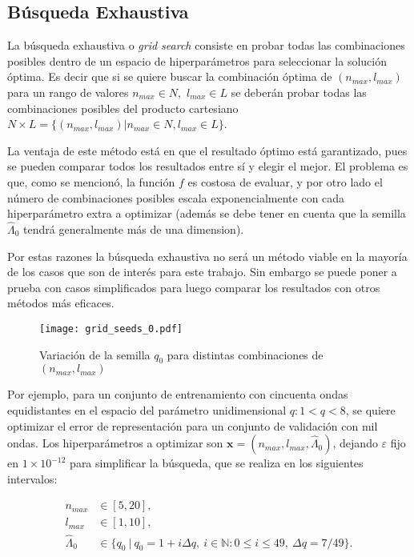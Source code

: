 \subsection{Búsqueda Exhaustiva}

 
 
 
 La búsqueda exhaustiva o \textit{grid search} consiste en probar todas las combinaciones posibles dentro de un espacio de hiperparámetros para seleccionar la solución óptima. Es decir que si se quiere buscar la combinación óptima de $(n_{max}, l_{max})$ para un rango de valores $n_{max} \in N,$ $l_{max} \in L$ se deberán probar todas las combinaciones posibles del producto cartesiano $N \times L = \{(n_{max}, l_{max}) | n_{max} \in N, l_{max} \in L\}$. 
 
La ventaja de este método está en que el resultado óptimo está garantizado, pues se pueden comparar todos los resultados entre sí y elegir el mejor. El problema es que, como se mencionó, la función $f$ es costosa de evaluar, y por otro lado el número de combinaciones posibles escala exponencialmente con cada hiperparámetro extra a optimizar (además se debe tener en cuenta que la semilla $\hat{\Lambda}_0$ tendrá generalmente más de una dimension).

Por estas razones la búsqueda exhaustiva no será un método viable en la mayoría de los casos que son de interés para este trabajo. Sin embargo se puede poner a prueba con casos simplificados para luego comparar los resultados con otros métodos más eficaces.

\begin{figure}[h!]
\centering
\texttt{[image: grid\_seeds\_0.pdf]}
\caption{Variación de la semilla $q_0$ para distintas combinaciones de $(n_{max}, l_{max})$}
\label{fig:grid_seed_0}
\end{figure}

Por ejemplo, para un conjunto de entrenamiento con cincuenta ondas equidistantes en el espacio del parámetro unidimensional $q: 1 < q < 8$, se quiere optimizar el error de representación para un conjunto de validación con mil ondas. Los hiperparámetros a optimizar son $\textbf{x} = (n_{max}, l_{max}, \hat{\Lambda}_0)$, dejando $\varepsilon$ fijo en $1\times 10^{-12}$ para simplificar la búsqueda, que se realiza en los siguientes intervalos:

\begin{align*}
n_{max} &\in [5, 20],\\
l_{max} &\in [1, 10],\\
\hat{\Lambda}_0 &\in \{q_0 \ | \ q_0 = 1 + i \Delta q, \ i\in \mathbb{N} : 0 \le i \le 49, \ \Delta q = 7/49 \}.
\end{align*}

